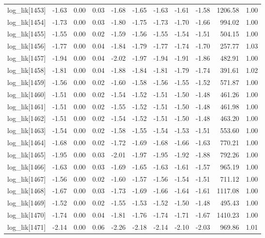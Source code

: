 \begin{table}[ht]
\begin{tabular}{rrrrrrrrrrr}
  log\_lik[1453] & -1.63 & 0.00 & 0.03 & -1.68 & -1.65 & -1.63 & -1.61 & -1.58 & 1206.58 & 1.00 \\ 
  log\_lik[1454] & -1.73 & 0.00 & 0.03 & -1.80 & -1.75 & -1.73 & -1.70 & -1.66 & 994.02 & 1.00 \\ 
  log\_lik[1455] & -1.55 & 0.00 & 0.02 & -1.59 & -1.56 & -1.55 & -1.54 & -1.51 & 504.15 & 1.00 \\ 
  log\_lik[1456] & -1.77 & 0.00 & 0.04 & -1.84 & -1.79 & -1.77 & -1.74 & -1.70 & 257.77 & 1.03 \\ 
  log\_lik[1457] & -1.94 & 0.00 & 0.04 & -2.02 & -1.97 & -1.94 & -1.91 & -1.86 & 482.91 & 1.00 \\ 
  log\_lik[1458] & -1.81 & 0.00 & 0.04 & -1.88 & -1.84 & -1.81 & -1.79 & -1.74 & 391.61 & 1.02 \\ 
  log\_lik[1459] & -1.56 & 0.00 & 0.02 & -1.60 & -1.58 & -1.56 & -1.55 & -1.52 & 571.87 & 1.00 \\ 
  log\_lik[1460] & -1.51 & 0.00 & 0.02 & -1.54 & -1.52 & -1.51 & -1.50 & -1.48 & 461.26 & 1.00 \\ 
  log\_lik[1461] & -1.51 & 0.00 & 0.02 & -1.55 & -1.52 & -1.51 & -1.50 & -1.48 & 461.98 & 1.00 \\ 
  log\_lik[1462] & -1.51 & 0.00 & 0.02 & -1.54 & -1.52 & -1.51 & -1.50 & -1.48 & 463.20 & 1.00 \\ 
  log\_lik[1463] & -1.54 & 0.00 & 0.02 & -1.58 & -1.55 & -1.54 & -1.53 & -1.51 & 553.60 & 1.00 \\ 
  log\_lik[1464] & -1.68 & 0.00 & 0.02 & -1.72 & -1.69 & -1.68 & -1.66 & -1.63 & 770.21 & 1.00 \\ 
  log\_lik[1465] & -1.95 & 0.00 & 0.03 & -2.01 & -1.97 & -1.95 & -1.92 & -1.88 & 792.26 & 1.00 \\ 
  log\_lik[1466] & -1.63 & 0.00 & 0.03 & -1.69 & -1.65 & -1.63 & -1.61 & -1.57 & 965.19 & 1.00 \\ 
  log\_lik[1467] & -1.56 & 0.00 & 0.02 & -1.60 & -1.57 & -1.56 & -1.54 & -1.51 & 711.12 & 1.00 \\ 
  log\_lik[1468] & -1.67 & 0.00 & 0.03 & -1.73 & -1.69 & -1.66 & -1.64 & -1.61 & 1117.08 & 1.00 \\ 
  log\_lik[1469] & -1.52 & 0.00 & 0.02 & -1.55 & -1.53 & -1.52 & -1.50 & -1.48 & 495.43 & 1.00 \\ 
  log\_lik[1470] & -1.74 & 0.00 & 0.04 & -1.81 & -1.76 & -1.74 & -1.71 & -1.67 & 1410.23 & 1.00 \\ 
  log\_lik[1471] & -2.14 & 0.00 & 0.06 & -2.26 & -2.18 & -2.14 & -2.10 & -2.03 & 969.86 & 1.01 \\ 

\end{tabular}
\end{table}
